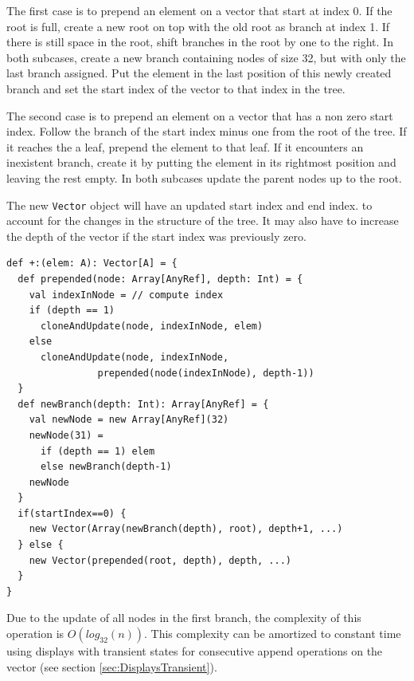 The first case is to prepend an element on a vector that start at index 0. If the root is full, create a new root on top with the old root as branch at index 1. If there is still space in the root, shift branches in the root by one to the right. In both sub\-cases, create a new branch containing nodes of size 32, but with only the last branch assigned. Put the element in the last position of this newly created branch and set the start index of the vector to that index in the tree.

The second case is to prepend an element on a vector that has a non zero start index. Follow the branch of the start index minus one from the root of the tree. If it reaches the a leaf, prepend the element to that leaf. If it encounters an inexistent branch, create it by putting the element in its rightmost position and leaving the rest empty. In both sub\-cases update the parent nodes up to the root.

The new \texttt{Vector} object will have an updated start index and end index. to account for the changes in the structure of the tree. It may also have to increase the depth of the vector if the start index was previously zero. 

\begin{lstlisting}[frame=single]
def +:(elem: A): Vector[A] = {
  def prepended(node: Array[AnyRef], depth: Int) = {
    val indexInNode = // compute index
    if (depth == 1) 
      cloneAndUpdate(node, indexInNode, elem)
    else 
      cloneAndUpdate(node, indexInNode, 
                prepended(node(indexInNode), depth-1))
  }
  def newBranch(depth: Int): Array[AnyRef] = {
    val newNode = new Array[AnyRef](32)
    newNode(31) = 
      if (depth == 1) elem 
      else newBranch(depth-1)
    newNode
  }
  if(startIndex==0) {
    new Vector(Array(newBranch(depth), root), depth+1, ...)
  } else {
    new Vector(prepended(root, depth), depth, ...)  
  }
}
\end{lstlisting}

Due to the update of all nodes in the first branch, the complexity of this operation is $O(log_{32}(n))$. This complexity can be amortized to constant time using displays with transient states for consecutive append operations on the vector (see section \ref{sec:DisplaysTransient}).


